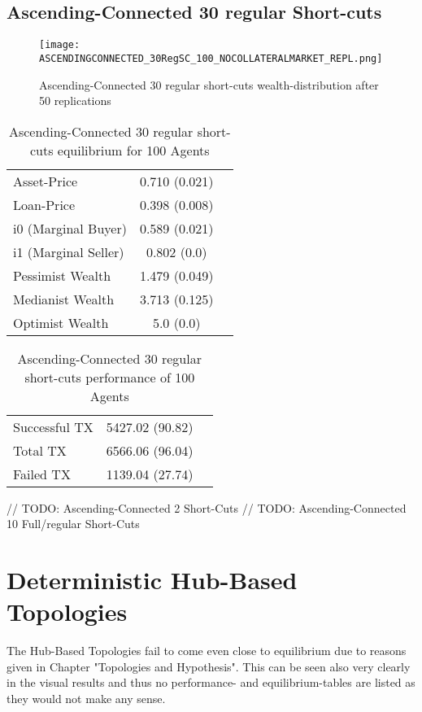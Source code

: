 \documentclass[Bachelorarbeit.tex]{subfiles}
\begin{document}
\subsection{Ascending-Connected 30 regular Short-cuts }
\begin{figure}[!htbp]
	\centering
  \texttt{[image: ASCENDINGCONNECTED\_30RegSC\_100\_NOCOLLATERALMARKET\_REPL.png]}
	\caption{Ascending-Connected 30 regular short-cuts wealth-distribution after 50 replications}
	\label{fig1}
\end{figure}

\begin{table}[!htbp]
	\caption{Ascending-Connected 30 regular short-cuts equilibrium for 100 Agents}
	\centering
	\begin{tabular} { l c r }
		\hline
		Asset-Price & 0.710 (0.021) \\
		Loan-Price & 0.398 (0.008) \\
		i0 (Marginal Buyer) & 0.589 (0.021) \\
		i1 (Marginal Seller) & 0.802 (0.0) \\
		Pessimist Wealth & 1.479 (0.049) \\
		Medianist Wealth & 3.713 (0.125) \\
		Optimist Wealth & 5.0 (0.0) \\
		\hline
	\end{tabular}
\end{table} 

\begin{table}[!htbp]
	\caption{Ascending-Connected 30 regular short-cuts performance of 100 Agents}
	\centering
	\begin{tabular} { l c r }
		\hline
		Successful TX & 5427.02 (90.82) \\
		Total TX & 6566.06 (96.04) \\
		Failed TX & 1139.04 (27.74) \\
		\hline
	\end{tabular}
\end{table}

// TODO: Ascending-Connected 2 Short-Cuts
// TODO: Ascending-Connected 10 Full/regular Short-Cuts


\section{Deterministic Hub-Based Topologies} 
The Hub-Based Topologies fail to come even close to equilibrium due to reasons given in Chapter "Topologies and Hypothesis". This can be seen also very clearly in the visual results and thus no performance- and equilibrium-tables are listed as they would not make any sense.
\end{document}
